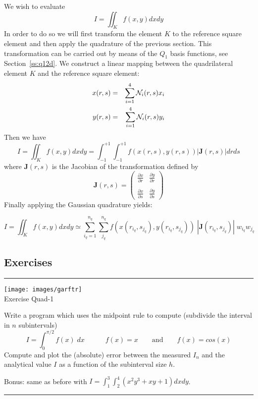 We wish to evaluate
\[
I =\iint_K f(x,y) dx dy
\]
In order to do so we will first transform the element $K$ to the 
reference square element and then apply the quadrature of the previous section.
This transformation can be carried out by means of the $Q_1$ basis functions, 
see Section~\ref{ss:q12d}. We construct a linear mapping between the 
quadrilateral element $K$ and the reference square element:
\begin{eqnarray}
x(r,s) &=& \sum_{i=1}^4 {\mathcal{N}}_i(r,s) x_i \\
y(r,s) &=& \sum_{i=1}^4 {\mathcal{N}}_i(r,s) y_i 
\end{eqnarray}
Then we have
\[
I=\iint_K f(x,y) dx dy = \int_{-1}^{+1}\int_{-1}^{+1} f(x(r,s),y(r,s)) |{\bm J}(r,s)| dr ds
\]
where ${\bm J}(r,s)$ is the Jacobian of the transformation defined by
\[
{\bm J}(r,s) = 
\left(
\begin{array}{cc}
\frac{\partial x}{\partial r} & \frac{\partial y}{\partial r} \\ \\
\frac{\partial x}{\partial s} & \frac{\partial y}{\partial s} 
\end{array}
\right)
\]
Finally applying the Gaussian quadrature yields:
\begin{mdframed}[backgroundcolor=blue!5]
\[
I=\iint_K f(x,y) dx dy \simeq 
\sum_{i_q=1}^{n_q}\sum_{j_q}^{n_q} f(x(r_{i_q},s_{j_q}),y(r_{i_q},s_{j_q}))
\; |{\bm J}(r_{i_q},s_{j_q})|  \; w_{i_q} w_{j_q}
\]
\end{mdframed}





\subsection{Exercises}

\begin{center}
\begin{minipage}[t]{0.77\textwidth}
\par\noindent\rule{\textwidth}{0.4pt}

\begin{center}
\texttt{[image: images/garftr]} \\
{\color{orange}Exercise Quad-1}
\end{center}

Write a program which uses the midpoint rule to compute (subdivide the interval in $n$ subintervals)
\[
I=\int_{0}^{\pi/2} f(x) \; dx    \quad \qquad f(x)=x \qquad \text{and} \qquad f(x)=cos(x)
\]
Compute and plot the (absolute) error between the measured $I_n$ and the analytical value $I$ as a function of the subinterval size $h$.

Bonus: same as before with $I=\int_{1}^{3}\int_{2}^{4} (x^2y^3 + xy +1)  dx dy$.
\par\noindent\rule{\textwidth}{0.4pt}
\end{minipage}
\end{center}


